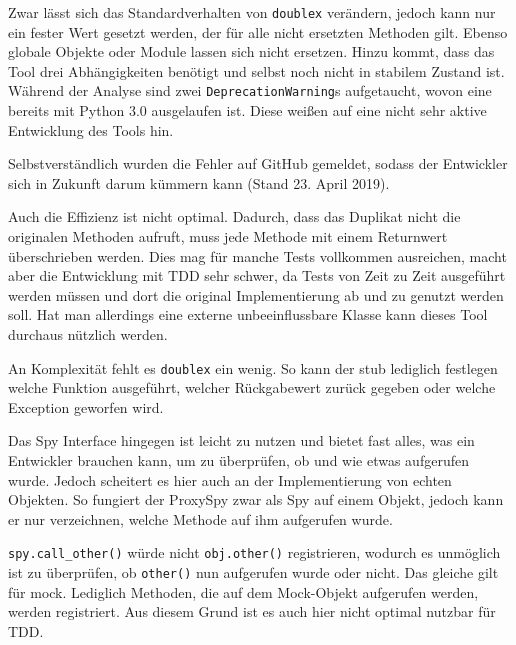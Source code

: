 Zwar lässt sich das Standardverhalten von \lstinline{doublex} verändern, jedoch
kann nur ein fester Wert gesetzt werden, der für alle nicht ersetzten Methoden
gilt. Ebenso globale Objekte oder Module lassen sich nicht ersetzen. Hinzu 
kommt, dass das Tool drei Abhängigkeiten benötigt und selbst noch nicht in 
stabilem
Zustand ist. Während der Analyse sind zwei \lstinline{DeprecationWarning}s
aufgetaucht, wovon eine bereits mit Python 3.0 ausgelaufen ist. Diese weißen auf
eine nicht sehr aktive Entwicklung des Tools hin.

Selbstverständlich wurden die Fehler auf GitHub gemeldet, sodass der Entwickler
sich in Zukunft darum kümmern kann (Stand 23. April 2019).

Auch die Effizienz ist nicht optimal. Dadurch, dass das Duplikat nicht die
originalen Methoden aufruft, muss jede Methode mit einem Returnwert
überschrieben werden. Dies mag für manche Tests vollkommen ausreichen, macht
aber die Entwicklung mit TDD sehr schwer, da Tests von Zeit zu Zeit ausgeführt
werden müssen und dort die original Implementierung ab und zu genutzt
werden soll. Hat man allerdings eine externe unbeeinflussbare Klasse
kann dieses Tool durchaus nützlich werden.

An Komplexität fehlt es \lstinline{doublex} ein wenig. So kann der \Gls{stub}
lediglich festlegen welche Funktion ausgeführt, welcher Rückgabewert zurück
gegeben oder welche Exception geworfen wird.

Das Spy Interface hingegen ist leicht zu nutzen und bietet fast alles, was ein
Entwickler brauchen kann, um zu überprüfen, ob und wie etwas aufgerufen wurde.
Jedoch scheitert es hier auch an der Implementierung von echten Objekten. So
fungiert der ProxySpy zwar als Spy auf einem Objekt, jedoch kann er nur
verzeichnen, welche Methode auf ihm aufgerufen wurde.

\lstinline{spy.call_other()} würde nicht \lstinline{obj.other()} registrieren,
wodurch es unmöglich ist zu überprüfen, ob \lstinline{other()} nun aufgerufen
wurde oder nicht. Das gleiche gilt für \Gls{mock}. Lediglich Methoden, die auf
dem Mock-Objekt aufgerufen werden, werden registriert. Aus diesem Grund ist es
auch hier nicht optimal nutzbar für TDD.